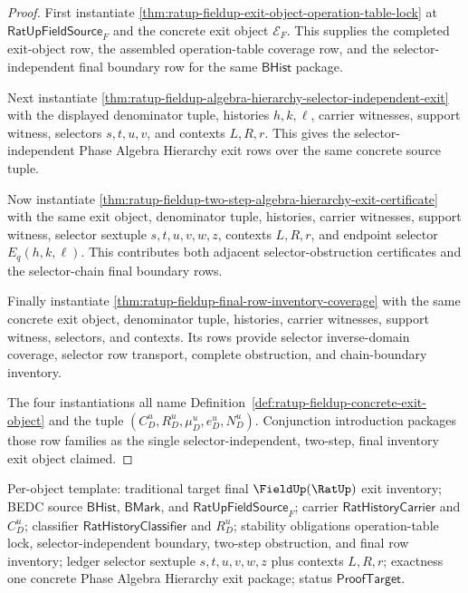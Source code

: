 \begin{proof}
First instantiate \autoref{thm:ratup-fieldup-exit-object-operation-table-lock}
at $\mathsf{RatUpFieldSource}_F$ and the concrete exit object $\mathcal E_F$.
This supplies the completed exit-object row, the assembled operation-table
coverage row, and the selector-independent final boundary row for the same
$\mathsf{BHist}$ package.

Next instantiate
\autoref{thm:ratup-fieldup-algebra-hierarchy-selector-independent-exit} with the
displayed denominator tuple, histories $h,k,\ell$, carrier witnesses, support
witness, selectors $s,t,u,v$, and contexts $L,R,r$. This gives the
selector-independent Phase Algebra Hierarchy exit rows over the same concrete
source tuple.

Now instantiate
\autoref{thm:ratup-fieldup-two-step-algebra-hierarchy-exit-certificate} with
the same exit object, denominator tuple, histories, carrier witnesses, support
witness, selector sextuple $s,t,u,v,w,z$, contexts $L,R,r$, and endpoint
selector $E_q(h,k,\ell)$. This contributes both adjacent selector-obstruction
certificates and the selector-chain final boundary rows.

Finally instantiate \autoref{thm:ratup-fieldup-final-row-inventory-coverage}
with the same concrete exit object, denominator tuple, histories, carrier
witnesses, support witness, selectors, and contexts. Its rows provide selector
inverse-domain coverage, selector row transport, complete obstruction, and
chain-boundary inventory.

The four instantiations all name Definition~\ref{def:ratup-fieldup-concrete-exit-object}
and the tuple $(C_D^u,R_D^u,\mu_D^u,e_D^u,N_D^u)$. Conjunction introduction
packages those row families as the single selector-independent, two-step, final
inventory exit object claimed.
\end{proof}

Per-object template: traditional target final $\FieldUp(\RatUp)$ exit
inventory; BEDC source $\mathsf{BHist}$, $\mathsf{BMark}$, and
$\mathsf{RatUpFieldSource}_F$; carrier $\mathsf{RatHistoryCarrier}$ and
$C_D^u$; classifier $\mathsf{RatHistoryClassifier}$ and $R_D^u$; stability
obligations operation-table lock, selector-independent boundary, two-step
obstruction, and final row inventory; ledger selector sextuple $s,t,u,v,w,z$
plus contexts $L,R,r$; exactness one concrete Phase Algebra Hierarchy exit
package; status $\mathsf{ProofTarget}$.


